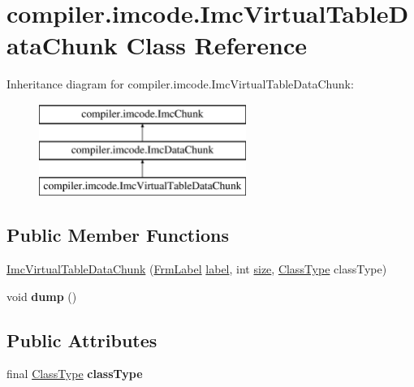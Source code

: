\hypertarget{classcompiler_1_1imcode_1_1_imc_virtual_table_data_chunk}{}\section{compiler.\+imcode.\+Imc\+Virtual\+Table\+Data\+Chunk Class Reference}
\label{classcompiler_1_1imcode_1_1_imc_virtual_table_data_chunk}
Inheritance diagram for compiler.\+imcode.\+Imc\+Virtual\+Table\+Data\+Chunk\+:\begin{figure}[H]
\begin{center}
\leavevmode
\includegraphics[height=3.000000cm]{classcompiler_1_1imcode_1_1_imc_virtual_table_data_chunk}
\end{center}
\end{figure}
\subsection*{Public Member Functions}
\begin{DoxyCompactItemize}
\item 
\hyperlink{classcompiler_1_1imcode_1_1_imc_virtual_table_data_chunk_ab0d0b93215d8b60f38400ae068932b20}{Imc\+Virtual\+Table\+Data\+Chunk} (\hyperlink{classcompiler_1_1frames_1_1_frm_label}{Frm\+Label} \hyperlink{classcompiler_1_1imcode_1_1_imc_data_chunk_ae3bdb3450a2c71be9415b349d165af3e}{label}, int \hyperlink{classcompiler_1_1imcode_1_1_imc_data_chunk_ad580e546fbdbc7446f513ef1647ffe97}{size}, \hyperlink{classcompiler_1_1seman_1_1type_1_1_class_type}{Class\+Type} class\+Type)
\item 
\mbox{\label{classcompiler_1_1imcode_1_1_imc_virtual_table_data_chunk_aa582c5b4eacc8fe6ee4995941149b17e}} 
void {\bfseries dump} ()
\end{DoxyCompactItemize}
\subsection*{Public Attributes}
\begin{DoxyCompactItemize}
\item 
\mbox{\label{classcompiler_1_1imcode_1_1_imc_virtual_table_data_chunk_a49d17e047a484bedc02d3a4d53608632}} 
final \hyperlink{classcompiler_1_1seman_1_1type_1_1_class_type}{Class\+Type} {\bfseries class\+Type}
\end{DoxyCompactItemize}


